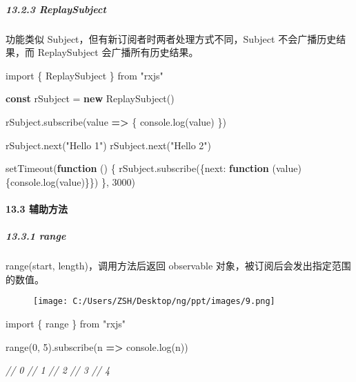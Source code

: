 \documentclass[
]{article}
\newenvironment{Shaded}{}{}
\newcommand{\BuiltInTok}[1]{#1}
\newcommand{\CommentTok}[1]{\textcolor[rgb]{0.38,0.63,0.69}{\textit{#1}}}
\newcommand{\DataTypeTok}[1]{\textcolor[rgb]{0.56,0.13,0.00}{#1}}
\newcommand{\DecValTok}[1]{\textcolor[rgb]{0.25,0.63,0.44}{#1}}
\newcommand{\FunctionTok}[1]{\textcolor[rgb]{0.02,0.16,0.49}{#1}}
\newcommand{\ImportTok}[1]{#1}
\newcommand{\KeywordTok}[1]{\textcolor[rgb]{0.00,0.44,0.13}{\textbf{#1}}}
\newcommand{\NormalTok}[1]{#1}
\newcommand{\OperatorTok}[1]{\textcolor[rgb]{0.40,0.40,0.40}{#1}}
\newcommand{\PreprocessorTok}[1]{\textcolor[rgb]{0.74,0.48,0.00}{#1}}
\newcommand{\StringTok}[1]{\textcolor[rgb]{0.25,0.44,0.63}{#1}}
\begin{document}
\hypertarget{1323-replaysubject}{%
\subparagraph{13.2.3 ReplaySubject}\label{1323-replaysubject}}

功能类似 Subject，但有新订阅者时两者处理方式不同，Subject
不会广播历史结果，而 ReplaySubject 会广播所有历史结果。

\begin{Shaded}
\begin{Highlighting}[]
\ImportTok{import}\NormalTok{ \{ ReplaySubject \} }\ImportTok{from} \StringTok{"rxjs"}

\KeywordTok{const}\NormalTok{ rSubject }\OperatorTok{=} \KeywordTok{new} \FunctionTok{ReplaySubject}\NormalTok{()}

\NormalTok{rSubject}\OperatorTok{.}\FunctionTok{subscribe}\NormalTok{(value }\KeywordTok{=\textgreater{}}\NormalTok{ \{}
  \BuiltInTok{console}\OperatorTok{.}\FunctionTok{log}\NormalTok{(value)}
\NormalTok{\})}

\NormalTok{rSubject}\OperatorTok{.}\FunctionTok{next}\NormalTok{(}\StringTok{"Hello 1"}\NormalTok{)}
\NormalTok{rSubject}\OperatorTok{.}\FunctionTok{next}\NormalTok{(}\StringTok{"Hello 2"}\NormalTok{)}

\PreprocessorTok{setTimeout}\NormalTok{(}\KeywordTok{function}\NormalTok{ () \{}
\NormalTok{  rSubject}\OperatorTok{.}\FunctionTok{subscribe}\NormalTok{(\{}\DataTypeTok{next}\OperatorTok{:} \KeywordTok{function}\NormalTok{ (value) \{}\BuiltInTok{console}\OperatorTok{.}\FunctionTok{log}\NormalTok{(value)\}\})}
\NormalTok{\}}\OperatorTok{,} \DecValTok{3000}\NormalTok{)}
\end{Highlighting}
\end{Shaded}

\hypertarget{133-ux8f85ux52a9ux65b9ux6cd5}{%
\paragraph{13.3 辅助方法}\label{133-ux8f85ux52a9ux65b9ux6cd5}}

\hypertarget{1331-range}{%
\subparagraph{13.3.1 range}\label{1331-range}}

range(start, length)，调用方法后返回 observable
对象，被订阅后会发出指定范围的数值。

\begin{figure}
\centering
\texttt{[image: C:/Users/ZSH/Desktop/ng/ppt/images/9.png]}
\caption{}
\end{figure}

\begin{Shaded}
\begin{Highlighting}[]
\ImportTok{import}\NormalTok{ \{ range \} }\ImportTok{from} \StringTok{"rxjs"}

\FunctionTok{range}\NormalTok{(}\DecValTok{0}\OperatorTok{,} \DecValTok{5}\NormalTok{)}\OperatorTok{.}\FunctionTok{subscribe}\NormalTok{(n }\KeywordTok{=\textgreater{}} \BuiltInTok{console}\OperatorTok{.}\FunctionTok{log}\NormalTok{(n))}

\CommentTok{// 0}
\CommentTok{// 1}
\CommentTok{// 2}
\CommentTok{// 3}
\CommentTok{// 4}
\end{Highlighting}
\end{Shaded}
\end{document}
